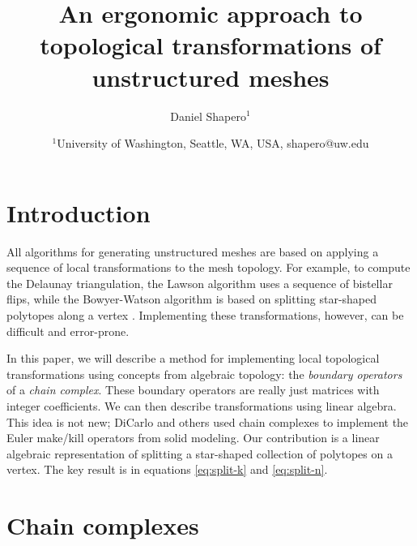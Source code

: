 \documentclass[twocolumn]{article}
\begin{document}
\title{An ergonomic approach to topological transformations of unstructured meshes}
\author{Daniel Shapero$^1$}
\date{
    $^1$University of Washington, Seattle, WA, USA, shapero@uw.edu
}



\maketitle
\thispagestyle{empty}
\pagestyle{empty}


\section{Introduction}

All algorithms for generating unstructured meshes are based on applying a sequence of local transformations to the mesh topology.
For example, to compute the Delaunay triangulation, the Lawson algorithm uses a sequence of bistellar flips, while the Bowyer-Watson algorithm is based on splitting star-shaped polytopes along a vertex \cite{berg1997computational, cheng2013delaunay}.
Implementing these transformations, however, can be difficult and error-prone.

In this paper, we will describe a method for implementing local topological transformations using concepts from algebraic topology: the \emph{boundary operators} of a \emph{chain complex}.
These boundary operators are really just matrices with integer coefficients.
We can then describe transformations using linear algebra.
This idea is not new; DiCarlo and others \cite{dicarlo2007solid} used chain complexes to implement the Euler make/kill operators from solid modeling.
Our contribution is a linear algebraic representation of splitting a star-shaped collection of polytopes on a vertex.
The key result is in equations \eqref{eq:split-k} and \eqref{eq:split-n}.


\section{Chain complexes}
\end{document}
